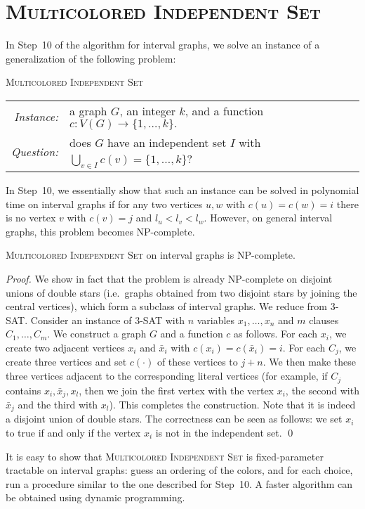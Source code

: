 \documentclass{llncs}
\newcommand{\ie}{i.e.~}
\newcommand{\problemMCIS}{\textsc{Multicolored Independent Set}}
\begin{document}
\section{\problemMCIS}
In Step~10 of the algorithm for interval graphs, we solve an instance of a generalization of the following problem:
\begin{center}
\begin{boxedminipage}{1\textwidth}
\problemMCIS{}\\[3mm]
\begin{tabular}{r l }
\textit{Instance:} & a graph $G$, an integer $k$, and a function $c : V(G) \rightarrow \{1,\ldots,k\}.$\\
\textit{Question:} & does $G$ have an independent set $I$ with $\bigcup_{v \in I} c(v) = \{1,\ldots,k\}$?  \\
\end{tabular}
\end{boxedminipage}
\end{center}
In Step~10, we essentially show that such an instance can be solved in polynomial time on interval graphs if for any two vertices $u,w$ with $c(u)=c(w)=i$ there is no vertex $v$ with $c(v)=j$ and $l_u < l_v < l_w$. However, on general interval graphs, this problem becomes NP-complete.

\begin{theorem}
\problemMCIS{} on interval graphs is NP-complete.
\end{theorem}
\begin{proof}
We show in fact that the problem is already NP-complete on disjoint unions of double stars (\ie graphs obtained from two disjoint stars by joining the central vertices), which form a subclass of interval graphs. We reduce from \textsc{3-SAT}. Consider an instance of \textsc{3-SAT} with $n$ variables $x_1,\ldots,x_n$ and $m$ clauses $C_1,\ldots,C_m$. We construct a graph $G$ and a function $c$ as follows. For each $x_i$, we create two adjacent vertices $x_i$ and $\bar{x}_i$ with $c(x_i) = c(\bar{x}_{i}) = i$. For each $C_j$, we create three vertices and set $c(\cdot)$ of these vertices to $j+n$. We then make these three vertices adjacent to the corresponding literal vertices (for example, if $C_j$ contains $x_i,\bar{x}_j,x_l$, then we join the first vertex with the vertex $x_i$, the second with $\bar{x}_j$ and the third with $x_l$). This completes the construction. Note that it is indeed a disjoint union of double stars. The correctness can be seen as follows: we set $x_i$ to true if and only if the vertex $x_i$ is not in the independent set.
\qed\end{proof}
It is easy to show that \problemMCIS{} is fixed-parameter tractable on interval graphs: guess an ordering of the colors, and for each choice, run a procedure similar to the one described for Step~10. A faster algorithm can be obtained using dynamic programming.
\end{document}
